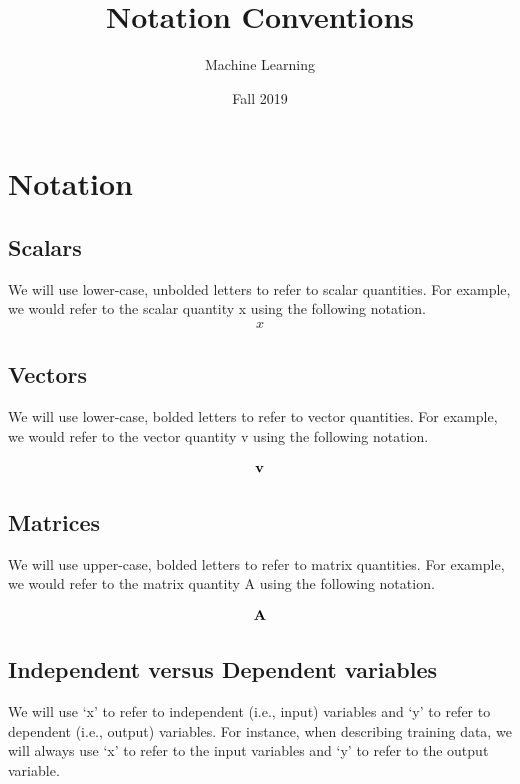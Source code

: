 \documentclass{tufte-handout}
\title{Notation Conventions}
\author{Machine Learning}
\date{Fall 2019}
\begin{document}
\maketitle
\thispagestyle{firstpage}

\section{Notation}

\subsection{Scalars}
We will use lower-case, unbolded letters to refer to scalar quantities.  For example, we would refer to the scalar quantity x using the following notation.
\begin{align}
x
\end{align}

\subsection{Vectors}

We will use lower-case, bolded letters to refer to vector quantities.  For example, we would refer to the vector quantity v using the following notation.

\begin{align}
\mathbf{v}
\end{align}

\subsection{Matrices}

We will use upper-case, bolded letters to refer to matrix quantities.  For example, we would refer to the matrix quantity A using the following notation.

\begin{align}
\mathbf{A}
\end{align}

\subsection{Independent versus Dependent variables}
We will use `x' to refer to independent (i.e., input) variables and `y' to refer to dependent (i.e., output) variables.  For instance, when describing training data, we will always use `x' to refer to the input variables and `y' to refer to the output variable.
\end{document}
